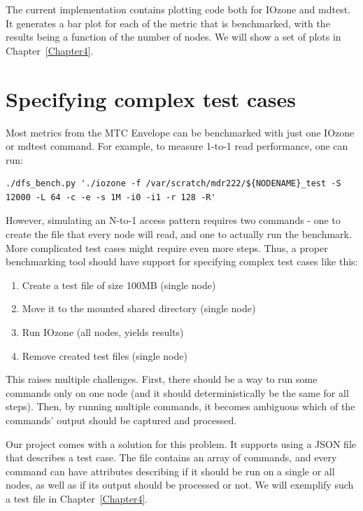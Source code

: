 The current implementation contains plotting code both for IOzone and mdtest. It generates a bar plot for each of the metric that is benchmarked, with the results being a function of the number of nodes. We will show a set of plots in Chapter~\ref{Chapter4}.





\section{Specifying complex test cases}

Most metrics from the MTC Envelope can be benchmarked with just one IOzone or mdtest command. For example, to measure 1-to-1 read performance, one can run:

\begin{lstlisting}[caption=Sample benchmark command]
./dfs_bench.py './iozone -f /var/scratch/mdr222/${NODENAME}_test -S 12000 -L 64 -c -e -s 1M -i0 -i1 -r 128 -R'
\end{lstlisting}

However, simulating an N-to-1 access pattern requires two commands - one to create the file that every node will read, and one to actually run the benchmark. More complicated test cases might require even more steps. Thus, a proper benchmarking tool should have support for specifying complex test cases like this:

\begin{enumerate}

\item Create a test file of size 100MB (single node)
\item Move it to the mounted shared directory (single node)
\item Run IOzone (all nodes, yields results)
\item Remove created test files (single node)

\end{enumerate}

This raises multiple challenges. First, there should be a way to run some commands only on one node (and it should deterministically be the same for all steps). Then, by running multiple commands, it becomes ambiguous which of the commands' output should be captured and processed.

Our project comes with a solution for this problem. It supports using a JSON file that describes a test case. The file contains an array of commands, and every command can have attributes describing if it should be run on a single or all nodes, as well as if its output should be processed or not. We will exemplify such a test file in Chapter~\ref{Chapter4}.

